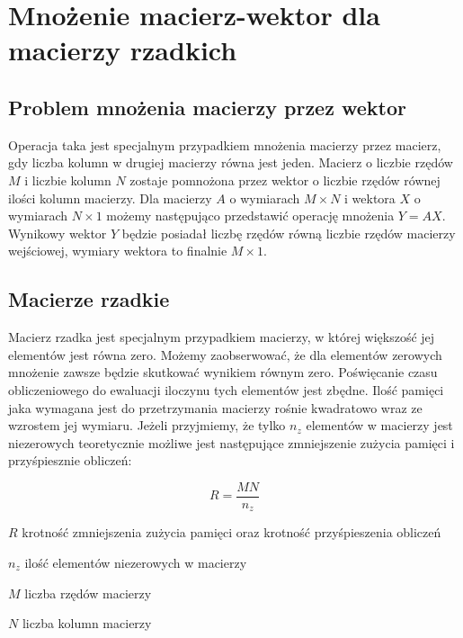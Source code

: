 \chapter{Mnożenie macierz-wektor dla macierzy rzadkich}
\label{cha:macierzwektor}

\section{Problem mnożenia macierzy przez wektor}
\label{sec:mnozeniemacierzwektor}

Operacja taka jest specjalnym przypadkiem mnożenia macierzy przez macierz, gdy liczba kolumn w drugiej macierzy równa jest jeden.
Macierz o liczbie rzędów $M$ i liczbie kolumn $N$ zostaje pomnożona przez wektor o liczbie rzędów równej ilości kolumn macierzy.
Dla macierzy $A$ o wymiarach $M \times N$ i wektora $X$ o wymiarach $N \times 1$ możemy następująco przedstawić operację mnożenia $Y = AX$.
Wynikowy wektor $Y$ będzie posiadał liczbę rzędów równą liczbie rzędów macierzy wejściowej, wymiary wektora to finalnie $M \times 1$.

\section{Macierze rzadkie}
\label{sec:macierzerzadkie}

Macierz rzadka jest specjalnym przypadkiem macierzy, w której większość jej elementów jest równa zero.
Możemy zaobserwować, że dla elementów zerowych mnożenie zawsze będzie skutkować wynikiem równym zero.
Poświęcanie czasu obliczeniowego do ewaluacji iloczynu tych elementów jest zbędne.
Ilość pamięci jaka wymagana jest do przetrzymania macierzy rośnie kwadratowo wraz ze wzrostem jej wymiaru.
Jeżeli przyjmiemy, że tylko $n_z$ elementów w macierzy jest niezerowych teoretycznie możliwe jest następujące zmniejszenie zużycia pamięci i przyśpiesznie obliczeń:

\begin{equation}
    R = \frac{M N}{n_z}
\end{equation}

\begin{eqwhere}[2cm]
	\item[$R$] krotność zmniejszenia zużycia pamięci oraz krotność przyśpieszenia obliczeń
	\item[$n_z$] ilość elementów niezerowych w macierzy
    \item[$M$] liczba rzędów macierzy
    \item[$N$] liczba kolumn macierzy
\end{eqwhere}

